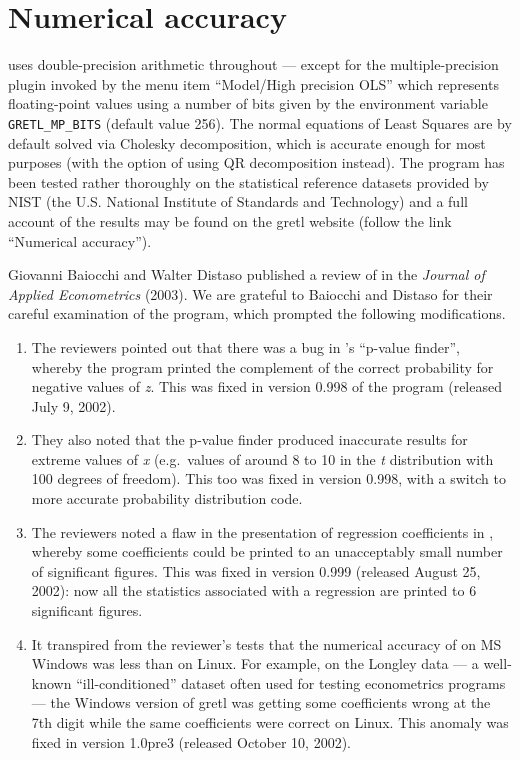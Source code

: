 \chapter{Numerical accuracy}
\label{app-accuracy}

 uses double-precision arithmetic throughout --- except for
the multiple-precision plugin invoked by the menu item ``Model/High
precision OLS'' which represents floating-point values using a number
of bits given by the environment variable \verb+GRETL_MP_BITS+
(default value 256).  The normal equations of Least Squares are by
default solved via Cholesky decomposition, which is accurate enough
for most purposes (with the option of using QR decomposition instead).
The program has been tested rather thoroughly on the statistical
reference datasets provided by NIST (the U.S. National Institute of
Standards and Technology) and a full account of the results may be
found on the gretl website (follow the link ``Numerical accuracy'').

Giovanni Baiocchi and Walter Distaso published a review of 
in the \emph{Journal of Applied Econometrics} (2003).  We are grateful
to Baiocchi and Distaso for their careful examination of the program,
which prompted the following modifications.

\begin{enumerate}
\item The reviewers pointed out that there was a bug in 's
  ``p-value finder'', whereby the program printed the complement of
  the correct probability for negative values of \emph{z}.  This was
  fixed in version 0.998 of the program (released July 9, 2002).
\item They also noted that the p-value finder produced inaccurate
  results for extreme values of \emph{x} (e.g.\ values of around 8 to
  10 in the \emph{t} distribution with 100 degrees of freedom).  This
  too was fixed in  version 0.998, with a switch to more
  accurate probability distribution code.
\item The reviewers noted a flaw in the presentation of regression
  coefficients in , whereby some coefficients could be
  printed to an unacceptably small number of significant figures.
  This was fixed in version 0.999 (released August 25, 2002): now all
  the statistics associated with a regression are printed to 6
  significant figures.
\item It transpired from the reviewer's tests that the numerical
  accuracy of  on MS Windows was less than on Linux.  For
  example, on the Longley data --- a well-known ``ill-conditioned''
  dataset often used for testing econometrics programs --- the Windows
  version of gretl was getting some coefficients wrong at the 7th
  digit while the same coefficients were correct on Linux.  This
  anomaly was fixed in  version 1.0pre3 (released October
  10, 2002).
\end{enumerate}

